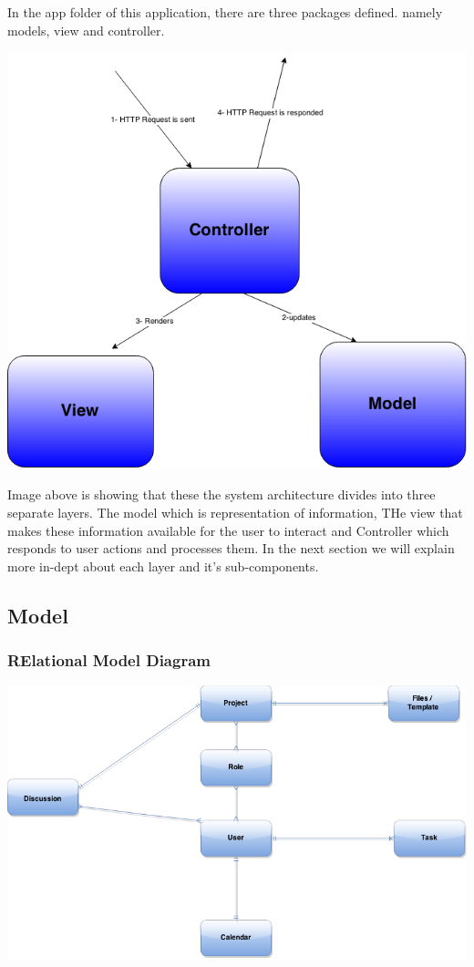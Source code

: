 In the app folder of this application, there are three packages defined. namely models, view and controller. 
\begin{center}
\includegraphics[scale=0.3]{./img/dsgn_img/MVCdiag.png}
	
\end{center}

Image above is showing that these the system architecture divides into three separate layers. The model which is representation of information, THe view that makes these information available for the user to interact and Controller which responds to user actions and processes them. In the next section we will explain more in-dept about each layer and it's sub-components.

\subsection{Model} %
\label{sub:design_rationale}

\subsubsection{RElational Model Diagram}
\begin{center}
\includegraphics[scale=0.3]{./img/dsgn_img/RMA.png}
	
\end{center}

